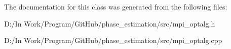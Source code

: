 The documentation for this class was generated from the following files\+:\begin{DoxyCompactItemize}
\item 
D\+:/\+In Work/\+Program/\+Git\+Hub/phase\+\_\+estimation/src/mpi\+\_\+optalg.\+h\item 
D\+:/\+In Work/\+Program/\+Git\+Hub/phase\+\_\+estimation/src/mpi\+\_\+optalg.\+cpp\end{DoxyCompactItemize}
